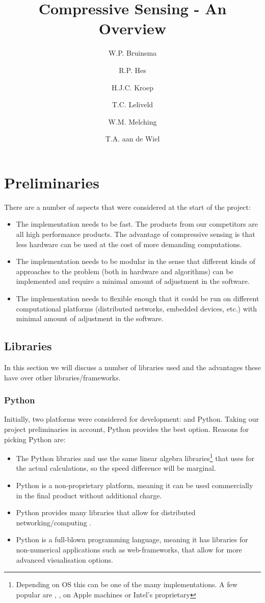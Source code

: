\documentclass[a4paper, openany, oneside]{memoir}
\title{Compressive Sensing - An Overview}
\author{W.P. Bruinsma \and R.P. Hes \and H.J.C. Kroep \and T.C. Leliveld \and W.M. Melching \and T.A. aan de Wiel}
\begin{document}
\chapter{Preliminaries}
There are a number of aspects that were considered at the start of the project:
\begin{itemize}
    \item The implementation needs to be fast. The products from our competitors are all high performance products. The advantage of compressive sensing is that less hardware can be used at the cost of more demanding computations.
    \item The implementation needs to be modular in the sense that different kinds of approaches to the problem (both in hardware and algorithms) can be implemented and require a minimal amount of adjustment in the software.
    \item The implementation needs to flexible enough that it could be run on different computational platforms (distributed networks, embedded devices, etc.) with minimal amount of adjustment in the software.
\end{itemize}

\section{Libraries}
\label{sec:libraries}
In this section we will discuss a number of libraries used and the advantages these have over other libraries/frameworks.

\subsection{Python}
\label{sec:python}
Initially, two platforms were considered for development: \matlab{} and Python. Taking our project preliminaries in account, Python provides the best option. Reasons for picking Python are:
\begin{itemize}
    \item The Python libraries  and  use the same linear algebra libraries\footnote{Depending on OS this can be one of the many implementations. A few popular are , ,  on Apple machines or Intel's proprietary } that \matlab{} uses for the actual calculations, so the speed difference will be marginal.
    \item Python is a non-proprietary platform, meaning it can be used commercially in the final product without additional charge.
    \item Python provides many libraries that allow for distributed networking/computing \cite{pythonmp}.
    \item Python is a full-blown programming language, meaning it has libraries for non-numerical applications such as web-frameworks, that allow for more advanced visualisation options.
\end{itemize}
\end{document}
